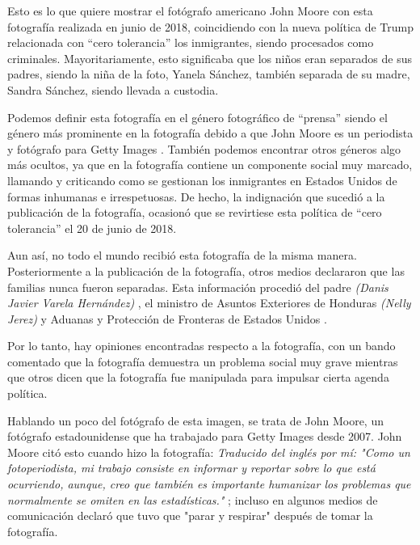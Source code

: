 \documentclass[11pt]{article}
\begin{document}
Esto es lo que quiere mostrar el fotógrafo americano John Moore con esta fotografía realizada en junio de 2018, coincidiendo con la nueva política de Trump relacionada con “cero tolerancia” los inmigrantes, siendo procesados como criminales. Mayoritariamente, esto significaba que los niños eran separados de sus padres, siendo la niña de la foto, Yanela Sánchez, también separada de su madre, Sandra Sánchez, siendo llevada a custodia. \newline

Podemos definir esta fotografía en el género fotográfico de “prensa” siendo el género más prominente en la fotografía debido a que John Moore es un periodista y fotógrafo para Getty Images \cite{world-press}. También podemos encontrar otros géneros algo más ocultos, ya que en la fotografía contiene un componente social muy marcado, llamando y criticando como se gestionan los inmigrantes en Estados Unidos de formas inhumanas e irrespetuosas. De hecho, la indignación que sucedió a la publicación de la fotografía, ocasionó que se revirtiese esta política de “cero tolerancia” el 20 de junio de 2018. \cite{hanna-2019} \newline

Aun así, no todo el mundo recibió esta fotografía de la misma manera. Posteriormente a la publicación de la fotografía, otros medios declararon que las familias nunca fueron separadas. Esta información procedió del padre \textit{(Danis Javier Varela Hernández)} \cite{sacks-2018}, el ministro de Asuntos Exteriores de Honduras \textit{(Nelly Jerez) }\cite{palencia-2019} y Aduanas y Protección de Fronteras de Estados Unidos \cite{sacks-2018}. \newline

Por lo tanto, hay opiniones encontradas respecto a la fotografía, con un bando comentado que la fotografía demuestra un problema social muy grave mientras que otros dicen que la fotografía fue manipulada para impulsar cierta agenda política. \newline

Hablando un poco del fotógrafo de esta imagen, se trata de John Moore, un fotógrafo estadounidense que ha trabajado para Getty Images desde 2007. John Moore citó esto cuando hizo la fotografía: \textit{Traducido del inglés por mí: "Como un fotoperiodista, mi trabajo consiste en informar y reportar sobre lo que está ocurriendo, aunque, creo que también es importante humanizar los problemas que normalmente se omiten en las estadísticas."} \cite{moore-2018}; incluso en algunos medios de comunicación declaró que tuvo que "parar y respirar" \cite{moore-2018} después de tomar la fotografía. \newline
\end{document}

